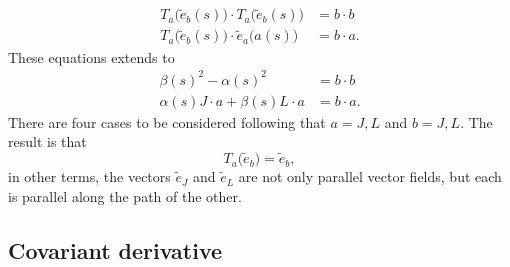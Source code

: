 \begin{subequations}
	\begin{align}
		T_a\big( \tilde{e}_b(s) \big)\cdot T_a\big( \tilde{e}_b(s) \big) & =b\cdot b  \\
		T_a\big( \tilde{e}_b(s) \big)\cdot \tilde{e}_a\big( a(s) \big)   & =b\cdot a.
	\end{align}
\end{subequations}
These equations extends to
\begin{subequations}
	\begin{align}
		\beta(s)^2-\alpha(s)^2             & =b\cdot b  \\
		\alpha(s)J\cdot a+\beta(s)L\cdot a & =b\cdot a.
	\end{align}
\end{subequations}
There are four cases to be considered following that $a=J,L$ and $b=J,L$. The result is that
\begin{equation}
	T_a\big(\tilde{e}_b \big)=\tilde{e}_b,
\end{equation}
in other terms, the vectors $\tilde{e}_J$ and $\tilde{e}_L$ are not only parallel vector fields, but each is parallel along the path of the other.

\subsection{Covariant derivative}

